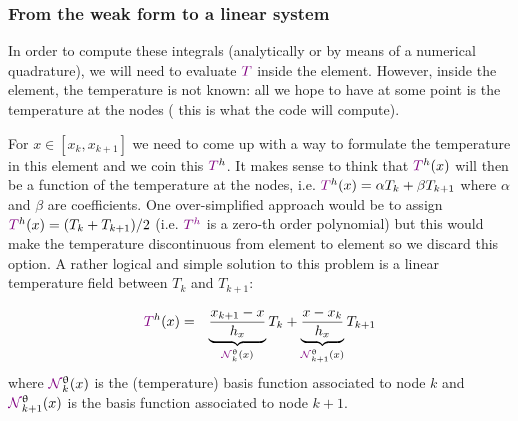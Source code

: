 \subsubsection{From the weak form to a linear system}

In order to compute these integrals (analytically or by means of a numerical quadrature), 
we will need to evaluate ${\color{violet}T}$ inside the element. However, inside the element, 
the temperature is not known: all we hope to have at some point is the temperature at the nodes (
this is what the code will compute). 

For $x\in [x_k,x_{k+1}]$ we need to come up with a way to formulate the temperature in this element and 
we coin this ${\color{violet}T}^h$.  
It makes sense to think that ${\color{violet}T}^h(x)$ will then be a function of the temperature at the nodes, 
i.e. ${\color{violet}T}^h(x) = \alpha T_k + \beta T_{k+1}$ where $\alpha$ and $\beta$ are coefficients. 
One over-simplified approach would be to assign ${\color{violet}T}^h(x)=(T_k + T_{k+1})/2$ 
(i.e. ${\color{violet}T^h}$ is a zero-th order polynomial) but this would make the
temperature discontinuous from element to element so we discard this option. 
A rather logical and simple solution to this problem is a linear temperature field between $T_k$
and $T_{k+1}$: 

\begin{eqnarray}
{\color{violet}T}^h(x) 
&=& \underbrace{\frac{x_{k+1}-x}{h_x}}_{{\color{violet}{\mathcal{N}}}_k^\uptheta(x)} T_k 
+ 
\underbrace{\frac{x-x_k}{h_x}}_{{\color{violet}{\mathcal{N}}}_{k+1}^\uptheta(x)} T_{k+1} \nonumber
\end{eqnarray}
where ${\color{violet}{\mathcal{N}}}_k^\uptheta(x)$ is the (temperature) basis function associated to node $k$ and 
${\color{violet}{\mathcal{N}}}_{k+1}^\uptheta(x)$ is the basis function associated to node $k+1$.

